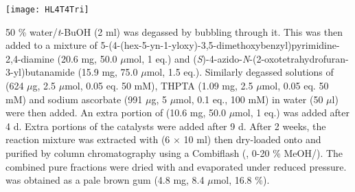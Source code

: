 {{{{{{{{{{{{{{{{{{{{{	

	
\begin{scheme}[H]
	\begin{center}
		\texttt{[image: HL4T4Tri]}
	\end{center}
\end{scheme}
50 \% water/\textit{t}-BuOH (2 ml) was degassed by bubbling  through it. This was then added to a mixture of 5-(4-(hex-5-yn-1-yloxy)-3,5-dimethoxybenzyl)pyrimidine-2,4-diamine  (20.6 mg, 50.0 $\mu$mol, 1 eq.) and (\textit{S})-4-azido-\textit{N}-(2-oxotetrahydrofuran-3-yl)butanamide  (15.9 mg, 75.0 $\mu$mol, 1.5 eq.).
Similarly degassed solutions of  (624 $\mu$g, 2.5 $\mu$mol, 0.05 eq. 50 mM), THPTA (1.09 mg, 2.5 $\mu$mol, 0.05 eq. 50 mM) and sodium ascorbate (991 $\mu$g, 5 $\mu$mol, 0.1 eq., 100 mM) in water (50 $\mu$l) were then added. An extra portion of  (10.6 mg, 50.0 $\mu$mol, 1 eq.) was added after 4 d. Extra portions of the catalysts were added after 9 d. 
After 2 weeks, the reaction mixture was extracted with  (6 $\times$ 10 ml) then dry-loaded onto  and purified by column chromatography using a Combiflash (, 0-20 \% MeOH/).%
The combined pure fractions were dried with  and evaporated under reduced pressure.
 was obtained as a pale brown gum (4.8 mg, 8.4 $\mu$mol, 16.8 \%).
\\[1\baselineskip]
\\[1\baselineskip]
}}}}}}}}}}}}}}}}}}}}}
